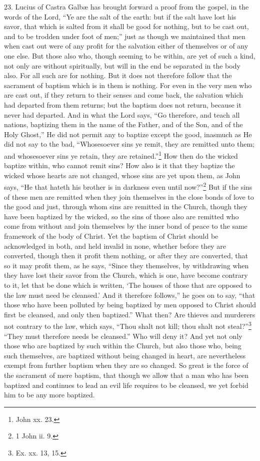 23. Lucius of Castra Galbæ has brought forward a proof from the gospel, in the words of the Lord, ``Ye are the salt of the earth: but if the salt have lost his savor, that which is salted from it shall be good for nothing, but to be cast out, and to be trodden under foot of men;'' just as though we maintained that men when cast out were of any profit for the salvation either of themselves or of any one else. But those also who, though seeming to be within, are yet of such a kind, not only are without spiritually, but will in the end be separated in the body also. For all such are for nothing. But it does not therefore follow that the sacrament of baptism which is in them is nothing. For even in the very men who are cast out, if they return to their senses and come back, the salvation which had departed from them returns; but the baptism does not return, because it never had departed. And in what the Lord says, ``Go therefore, and teach all nations, baptizing them in the name of the Father, and of the Son, and of the Holy Ghost,'' He did not permit any to baptize except the good, inasmuch as He did not say to the bad, ``Whosesoever sins ye remit, they are remitted unto them; and whosesoever sins ye retain, they are retained.''\footnote{\par  John xx. 23.} How then do the wicked baptize within, who cannot remit sins? How also is it that they baptize the wicked whose hearts are not changed, whose sins are yet upon them, as John says, ``He that hateth his brother is in darkness even until now?''\footnote{\par  1 John ii. 9.} But if the sins of these men are remitted when they join themselves in the close bonds of love to the good and just, through whom sins are remitted in the Church, though they have been baptized by the wicked, so the sins of those also are remitted who come from without and join themselves by the inner bond of peace to the same framework of the body of Christ. Yet the baptism of Christ should be acknowledged in both, and held invalid in none, whether before they are converted, though then it profit them nothing, or after they are converted, that so it may profit them, as he says, ``Since they themselves, by withdrawing when they have lost their savor from the Church, which is one, have become contrary to it, let that be done which is written, ‘The houses of those that are opposed to the law must need be cleansed.’ And it therefore follows,'' he goes on to say, ``that those who have been polluted by being baptized by men opposed to Christ should first be cleansed, and only then baptized.'' What then? Are thieves and murderers not contrary to the law, which says, ``Thou shalt not kill; thou shalt not steal?''\footnote{\par  Ex. xx. 13, 15.} ``They must therefore needs be cleansed.'' Who will deny it? And yet not only those who are baptized by such within the Church, but also those who, being such themselves, are baptized without being changed in heart, are nevertheless exempt from further baptism when they are so changed. So great is the force of the sacrament of mere baptism, that though we allow that a man who has been baptized and continues to lead an evil life requires to be cleansed, we yet forbid him to be any more baptized.

